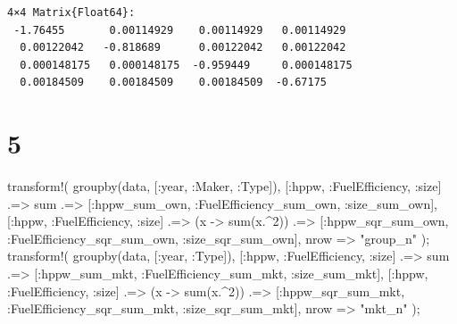 \documentclass[
  letterpaper,
  DIV=11,
  numbers=noendperiod]{scrreprt}
\newenvironment{Shaded}{\begin{snugshade}}{\end{snugshade}}
\newcommand{\DataTypeTok}[1]{\textcolor[rgb]{0.68,0.00,0.00}{#1}}
\newcommand{\FloatTok}[1]{\textcolor[rgb]{0.68,0.00,0.00}{#1}}
\newcommand{\FunctionTok}[1]{\textcolor[rgb]{0.28,0.35,0.67}{#1}}
\newcommand{\NormalTok}[1]{\textcolor[rgb]{0.00,0.23,0.31}{#1}}
\newcommand{\OperatorTok}[1]{\textcolor[rgb]{0.37,0.37,0.37}{#1}}
\newcommand{\StringTok}[1]{\textcolor[rgb]{0.13,0.47,0.30}{#1}}
\begin{document}
\begin{verbatim}
4×4 Matrix{Float64}:
 -1.76455       0.00114929    0.00114929   0.00114929
  0.00122042   -0.818689      0.00122042   0.00122042
  0.000148175   0.000148175  -0.959449     0.000148175
  0.00184509    0.00184509    0.00184509  -0.67175
\end{verbatim}

\hypertarget{section-1}{%
\section{5}\label{section-1}}

\begin{Shaded}
\begin{Highlighting}[]
\FunctionTok{transform!}\NormalTok{(}
    \FunctionTok{groupby}\NormalTok{(data, [}\OperatorTok{:}\NormalTok{year, }\OperatorTok{:}\NormalTok{Maker, }\OperatorTok{:}\DataTypeTok{Type}\NormalTok{]),}
\NormalTok{    [}\OperatorTok{:}\NormalTok{hppw, }\OperatorTok{:}\NormalTok{FuelEfficiency, }\OperatorTok{:}\NormalTok{size] }\OperatorTok{.=\textgreater{}}\NormalTok{ sum }\OperatorTok{.=\textgreater{}}\NormalTok{ [}\OperatorTok{:}\NormalTok{hppw\_sum\_own, }\OperatorTok{:}\NormalTok{FuelEfficiency\_sum\_own, }\OperatorTok{:}\NormalTok{size\_sum\_own],}
\NormalTok{    [}\OperatorTok{:}\NormalTok{hppw, }\OperatorTok{:}\NormalTok{FuelEfficiency, }\OperatorTok{:}\NormalTok{size] }\OperatorTok{.=\textgreater{}}\NormalTok{ (x }\OperatorTok{{-}\textgreater{}} \FunctionTok{sum}\NormalTok{(x}\OperatorTok{.\^{}}\FloatTok{2}\NormalTok{)) }\OperatorTok{.=\textgreater{}}\NormalTok{ [}\OperatorTok{:}\NormalTok{hppw\_sqr\_sum\_own, }\OperatorTok{:}\NormalTok{FuelEfficiency\_sqr\_sum\_own, }\OperatorTok{:}\NormalTok{size\_sqr\_sum\_own],}
\NormalTok{    nrow }\OperatorTok{=\textgreater{}} \StringTok{"group\_n"}
\NormalTok{);}
\FunctionTok{transform!}\NormalTok{(}
    \FunctionTok{groupby}\NormalTok{(data, [}\OperatorTok{:}\NormalTok{year, }\OperatorTok{:}\DataTypeTok{Type}\NormalTok{]),}
\NormalTok{    [}\OperatorTok{:}\NormalTok{hppw, }\OperatorTok{:}\NormalTok{FuelEfficiency, }\OperatorTok{:}\NormalTok{size] }\OperatorTok{.=\textgreater{}}\NormalTok{ sum }\OperatorTok{.=\textgreater{}}\NormalTok{ [}\OperatorTok{:}\NormalTok{hppw\_sum\_mkt, }\OperatorTok{:}\NormalTok{FuelEfficiency\_sum\_mkt, }\OperatorTok{:}\NormalTok{size\_sum\_mkt],}
\NormalTok{    [}\OperatorTok{:}\NormalTok{hppw, }\OperatorTok{:}\NormalTok{FuelEfficiency, }\OperatorTok{:}\NormalTok{size] }\OperatorTok{.=\textgreater{}}\NormalTok{ (x }\OperatorTok{{-}\textgreater{}} \FunctionTok{sum}\NormalTok{(x}\OperatorTok{.\^{}}\FloatTok{2}\NormalTok{)) }\OperatorTok{.=\textgreater{}}\NormalTok{ [}\OperatorTok{:}\NormalTok{hppw\_sqr\_sum\_mkt, }\OperatorTok{:}\NormalTok{FuelEfficiency\_sqr\_sum\_mkt, }\OperatorTok{:}\NormalTok{size\_sqr\_sum\_mkt],}
\NormalTok{    nrow }\OperatorTok{=\textgreater{}} \StringTok{"mkt\_n"}
\NormalTok{);}


\end{Highlighting}
\end{Shaded}
\end{document}
